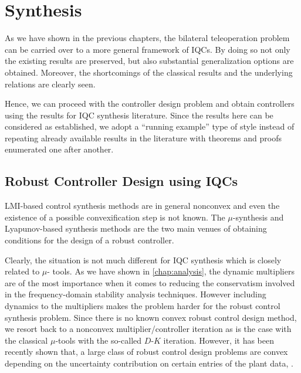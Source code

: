 \chapter{Synthesis}
\label{chap:synth}

As we have shown in the previous chapters, the bilateral teleoperation problem can be carried over to a more general
framework of IQCs. By doing so not only the existing results are preserved, but also substantial generalization
options are obtained. Moreover, the shortcomings of the classical results and the underlying relations are clearly 
seen. 

Hence, we can proceed with the controller design problem and obtain controllers using the results for IQC synthesis
literature. Since the results here can be considered as established, we adopt a \enquote{running example} type of style 
instead of repeating already available results in the literature with theorems and proofs enumerated one after another.

\section{Robust Controller Design using IQCs}
LMI-based control synthesis methods are in general nonconvex and even the existence of a possible convexification step 
is not known. The $\mu$-synthesis and Lyapunov-based synthesis methods are the two main venues of obtaining conditions
for the design of a robust controller. 

Clearly, the situation is not much different for IQC synthesis which is closely related to $\mu$-
tools. As we have shown in \cref{chap:analysis}, the dynamic multipliers are of the most importance when it comes to 
reducing the conservatism involved in the frequency-domain stability analysis techniques. However including dynamics 
to the multipliers makes the problem harder for the robust control synthesis problem. Since there is no known convex 
robust control design method, we resort back to a nonconvex multiplier/controller iteration as is the case with 
the classical $\mu$-tools with the so-called $D$-$K$ iteration. However, it has been recently shown that, a large class
of robust control design problems are convex depending on the uncertainty contribution on certain entries of the plant 
data, \cite{scherer2009}. 
